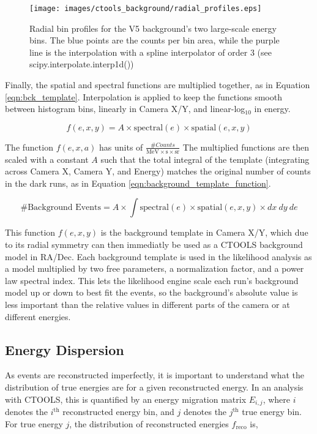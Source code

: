     \begin{figure}[ht]
      \centering
      \texttt{[image: images/ctools\_background/radial\_profiles.eps]}
      \caption[CTOOLS Radial Background Profiles]{
        Radial bin profiles for the V5 background's two large-scale energy bins.
        The blue points are the counts per bin area, while the purple line is the interpolation with a spline interpolator of order 3 (see scipy.interpolate.interp1d())
        }
      \label{fig:background_radial}
    \end{figure}
    
    Finally, the spatial and spectral functions are multiplied together, as in Equation \ref{eqn:bck_template}.
    Interpolation is applied to keep the functions smooth between histogram bins, linearly in Camera X/Y, and linear-log${}_{10}$ in energy.
    
    \begin{equation}\label{eqn:bck_template}
      f(e,x,y) = A \times \textrm{spectral}(e) \times \textrm{spatial}(e,x,y) 
    \end{equation} 
    
    The function $f(e,x,a)$ has units of $\frac{\# Counts}{ \textrm{MeV} \times \textrm{s} \times \textrm{sr} }$
    The multiplied functions are then scaled with a constant $A$ such that the total integral of the template (integrating across Camera X, Camera Y, and Energy) matches the original number of counts in the dark runs, as in Equation \ref{eqn:background_template_function}.
    
    \begin{equation}\label{eqn:background_template_function}
      \textrm{\# Background Events} = A \times \int \textrm{spectral}(e) \times \textrm{spatial}(e,x,y) \times dx \: dy \: de
    \end{equation}

    This function $f(e,x,y)$ is the background template in Camera X/Y, which due to its radial symmetry can then immediatly be used as a CTOOLS background model in RA/Dec.
    Each background template is used in the likelihood analysis as a model multiplied by two free parameters, a normalization factor, and a power law spectral index.
    This lets the likelihood engine scale each run's background model up or down to best fit the events, so the background's absolute value is less important than the relative values in different parts of the camera or at different energies.

  \subsection{Energy Dispersion}\label{subsec:edisp}
    As events are reconstructed imperfectly, it is important to understand what the distribution of true energies are for a given reconstructed energy.
    In an analysis with CTOOLS, this is quantified by an energy migration matrix $E_{i,j}$, where $i$ denotes the $i^{\text{th}}$ reconstructed energy bin, and $j$ denotes the $j^{\text{th}}$ true energy bin.
    For true energy $j$, the distribution of reconstructed energies $f_{\text{reco}}$ is,

